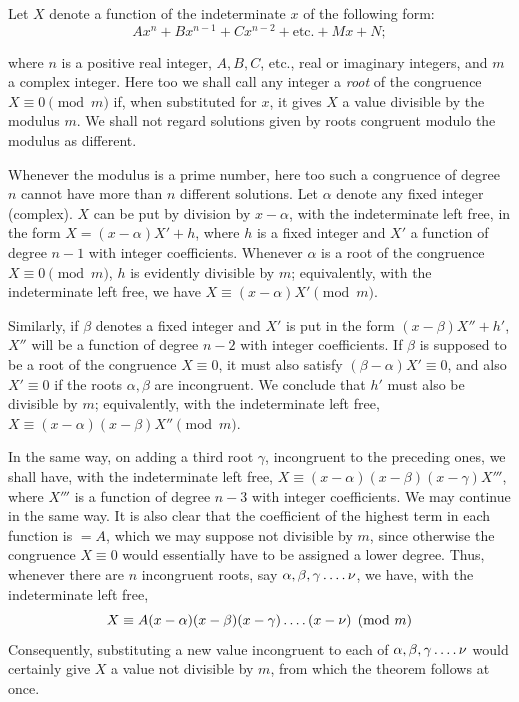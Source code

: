 Let $X$ denote a function of the indeterminate $x$ of the following form:
\[
Ax^n+Bx^{n-1}+Cx^{n-2}+\text{etc.}+Mx+N;
\]

%
where $n$ is a positive real integer, $A,B,C$, etc., real or imaginary integers, and $m$ a complex integer. Here too we shall call any integer a \emph{root} of the congruence $X\equiv0\pmod m$ if, when substituted for $x$, it gives $X$ a value divisible by the modulus $m$. We shall not regard solutions given by roots congruent modulo the modulus as different.

Whenever the modulus is a prime number, here too such a congruence of degree $n$ cannot have more than $n$ different solutions. Let $\alpha$ denote any fixed integer (complex). $X$ can be put by division by $x-\alpha$, with the indeterminate left free, in the form $X=(x-\alpha)X'+h$, where $h$ is a fixed integer and $X'$ a function of degree $n-1$ with integer coefficients. Whenever $\alpha$ is a root of the congruence $X\equiv0\pmod m$, $h$ is evidently divisible by $m$; equivalently, with the indeterminate left free, we have $X\equiv(x-\alpha)X'\pmod m$.

Similarly, if $\beta$ denotes a fixed integer and $X'$ is put in the form $(x-\beta)X''+h'$, $X''$ will be a function of degree $n-2$ with integer coefficients. If $\beta$ is supposed to be a root of the congruence $X\equiv0$, it must also satisfy $(\beta-\alpha)X'\equiv0$, and also $X'\equiv0$ if the roots $\alpha,\beta$ are incongruent. We conclude that $h'$ must also be divisible by $m$; equivalently, with the indeterminate left free, $X\equiv(x-\alpha)(x-\beta)X''\pmod m$.

In the same way, on adding a third root $\gamma$, incongruent to the preceding ones, we shall have, with the indeterminate left free, $X\equiv(x-\alpha)(x-\beta)(x-\gamma)X'''$, where $X'''$ is a function of degree $n-3$ with integer coefficients. We may continue in the same way. It is also clear that the coefficient of the highest term in each function is $=A$, which we may suppose not divisible by $m$, since otherwise the congruence $X\equiv0$ would essentially have to be assigned a lower degree. Thus, whenever there are $n$ incongruent roots, say $\alpha,\beta,\gamma\mathinner{.\,.\,.\,.}\nu$, we have, with the indeterminate left free,
\[
X\equiv A(x-\alpha)(x-\beta)(x-\gamma)\mathinner{.\,.\,.\,.}(x-\nu)\pmod m
\]
Consequently, substituting a new value incongruent to each of $\alpha,\beta,\gamma\mathinner{.\,.\,.\,.}\nu$ would certainly give $X$ a value not divisible by $m$, from which the theorem follows at once.

